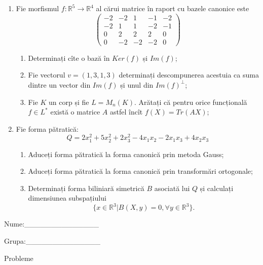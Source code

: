 \documentclass{article}
\begin{document}
\begin{enumerate}
 \item Fie morfismul $f:\mathbb{R}^5 \to \mathbb{R}^4$ al cărui matrice în raport cu bazele canonice este
$$\begin{pmatrix}
-2&-2&1&-1&-2\\
-2&1&1&-2&-1\\
0&2&2&2&0\\
0&-2&-2&-2&0
\end{pmatrix}$$

\begin{enumerate}
\item Determinați cîte o bază în $Ker(f)$ și $Im(f)$;
\item Fie vectorul $v=(1,3,1,3)$ determinați descompunerea acestuia ca suma dintre un vector din $Im(f)$ și unul din $Im(f)^\perp$;
\item Fie $K$ un corp și fie $L=M_n(K)$. Arătați că pentru orice funcțională $f \in L^*$ există o matrice $A$ astfel încît $f(X)=Tr(AX)$;
\end{enumerate}
\item Fie forma pătratică:
$$Q= 2x_1^2+5x_2^2+2x_3^2-4x_1x_2-2x_1x_3+4x_2x_3$$

\begin{enumerate}
\item Aduceți forma pătratică la forma canonică prin metoda Gauss;
\item Aduceți forma pătratică la forma canonică prin transformări ortogonale;
\item Determinați forma biliniară simetrică $B$ asociată lui $Q$ și calculați dimensiunea subspațiului
$$\{x \in \mathbb{R}^3 | B(X,y)=0,\forall y \in \mathbb{R}^3\}.$$

\end{enumerate}
\end{enumerate}
\newpage
\begin{flushright}
Nume:\_\_\_\_\_\_\_\_\_\_\_\_\_\_
 
 
Grupa:\_\_\_\_\_\_\_\_\_\_\_\_\_\_
\end{flushright}
\begin{center}
\vspace{2cm}
{\Large Probleme}
\vspace{2cm}
\end{center}
\end{document}

